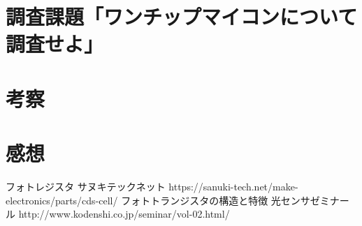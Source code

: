 \documentclass[titlepage]{jsarticle}
\begin{document}
\section{調査課題「ワンチップマイコンについて調査せよ」}
    

\section{考察}
    

\section{感想}
    

\begin{thebibliography}{99}
     フォトレジスタ サヌキテックネット https://sanuki-tech.net/make-electronics/parts/cds-cell/
     フォトトランジスタの構造と特徴 光センサゼミナール http://www.kodenshi.co.jp/seminar/vol-02.html/
\end{thebibliography}
\end{document}
